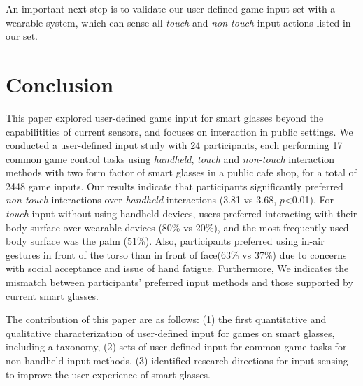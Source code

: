 \documentclass{sigchi}
\begin{document}
  An important next step is to validate our user-defined game input set with a wearable system, which can sense all \emph{touch} and \emph{non-touch} input actions listed in our set.   


\section{Conclusion}
This paper explored user-defined game input for smart glasses beyond the capabilitities of current sensors, and focuses on interaction in public settings. We conducted a user-defined input study with 24 participants, each performing 17 common game control tasks using \emph{handheld}, \emph{touch} and \emph{non-touch} interaction methods with two form factor of smart glasses in a public cafe shop, for a total of 2448 game inputs. Our results indicate that participants significantly preferred \emph{non-touch} interactions over \emph{handheld} interactions (3.81 vs 3.68, $p$<0.01). For \emph{touch} input without using handheld devices, users preferred interacting with their body surface over wearable devices (80\% vs 20\%), and the most frequently used body surface was the palm (51\%). Also, participants preferred using in-air gestures in front of the torso than in front of face(63\% vs 37\%) due to concerns with social acceptance and issue of hand fatigue. Furthermore, We indicates the mismatch between participants' preferred input methods and those supported by current smart glasses.

The contribution of this paper are as follows:
(1) the first quantitative and qualitative characterization of user-defined input for games on smart glasses, including a taxonomy, 
(2) sets of user-defined input for common game tasks for non-handheld input methods, 
(3) identified research directions for input sensing to improve the user experience of smart glasses.


\end{document}
